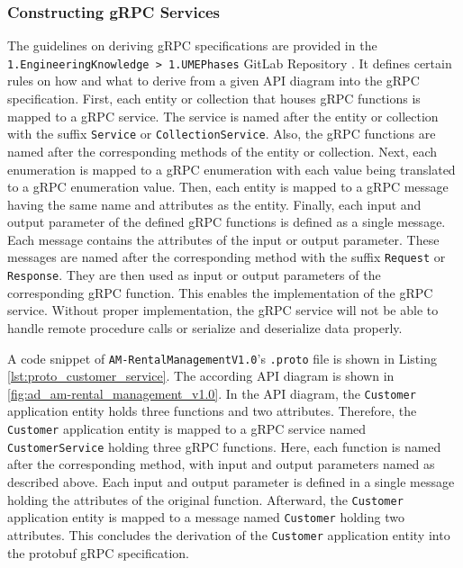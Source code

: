 \subsubsection*{Constructing gRPC Services}
The guidelines on deriving gRPC specifications are provided in the \hfill \linebreak \texttt{1.EngineeringKnowledge > 1.UMEPhases} GitLab Repository \cite{CM-G-RPC}.
It defines certain rules on how and what to derive from a given API diagram into the gRPC specification.
First, each entity or collection that houses gRPC functions is mapped to a gRPC service.
The service is named after the entity or collection with the suffix \texttt{Service} or \texttt{CollectionService}.
Also, the gRPC functions are named after the corresponding methods of the entity or collection.
Next, each enumeration is mapped to a gRPC enumeration with each value being translated to a gRPC enumeration value.
Then, each entity is mapped to a gRPC message having the same name and attributes as the entity.
Finally, each input and output parameter of the defined gRPC functions is defined as a single message.
Each message contains the attributes of the input or output parameter.
These messages are named after the corresponding method with the suffix \texttt{Request} or \texttt{Response}.
They are then used as input or output parameters of the corresponding gRPC function. \linebreak
This enables the implementation of the gRPC service.
Without proper implementation, the gRPC service will not be able to handle remote procedure calls or serialize and deserialize data properly.

A code snippet of \texttt{AM-RentalManagementV1.0}'s \texttt{.proto} file is shown in Listing \autoref{lst:proto_customer_service}.
The according API diagram is shown in \autoref{fig:ad_am-rental_management_v1.0}.
In the API diagram, the \texttt{Customer} application entity holds three functions and two attributes.
Therefore, the \texttt{Customer} application entity is mapped to a gRPC service named \texttt{CustomerService} holding three gRPC functions.
Here, each function is named after the corresponding method, with input and output parameters named as described above.
Each input and output parameter is defined in a single message holding the attributes of the original function.
Afterward, the \texttt{Customer} application entity is mapped to a message named \texttt{Customer} holding two attributes.
This concludes the derivation of the \texttt{Customer} application entity into the protobuf gRPC specification.

